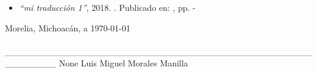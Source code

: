 \documentclass[12pt]{report}
\begin{document}
\begin{enumerate}
\begin{enumerate}
\begin{enumerate}
\begin{itemize}
\begin{itemize}
                                                                \item{ \textit{``mi traducción 1''}, 2018. . Publicado en: , pp. - }

                                                        \end{itemize}



                                            \end{itemize}

                            \end{enumerate}





                \end{enumerate}









    \end{enumerate}













\begin{center}
Morelia, Michoacán, a \today \\
\vspace{15cm} \\
________________________________________________________
None Luis Miguel Morales Manilla
\end{center}
\end{document}
